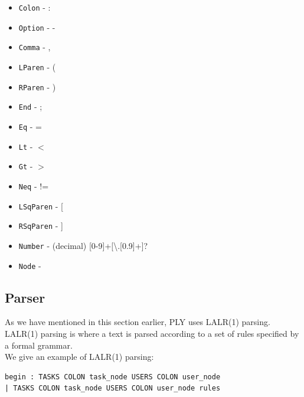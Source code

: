 \documentclass[a4paper]{report}
\begin{document}
\begin{itemize}
\item \texttt{Colon} - : 
\item \texttt{Option} - -
\item \texttt{Comma} - ,
\item \texttt{LParen} - (
\item \texttt{RParen} - )
\item \texttt{End} - ;
\item \texttt{Eq} - =
\item \texttt{Lt} - $<$
\item \texttt{Gt} - $>$
\item \texttt{Neq} - !=
\item \texttt{LSqParen} - [
\item \texttt{RSqParen} - ]
\item \texttt{Number} - (decimal)  [0-9]+[\textbackslash.[0.9]+]?
\item \texttt{Node} - 
\end{itemize}

\subsection{Parser}
As we have mentioned in this section earlier, PLY uses LALR(1) parsing. LALR(1) parsing is where a text is parsed according to a set of rules specified by a formal grammar.\\
We give an example of LALR(1) parsing:
\lstset{numbers=none, showspaces=false,
    showstringspaces=false, tabsize=2, breaklines=true,
    xleftmargin=5.0ex,
}
\begin{lstlisting}[frame=single]
begin : TASKS COLON task_node USERS COLON user_node
| TASKS COLON task_node USERS COLON user_node rules
\end{lstlisting}
\end{document}

